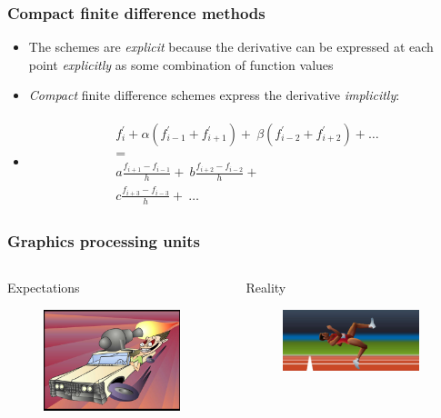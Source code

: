 \documentclass{beamer}
\begin{document}
\begin{frame}
\frametitle{Compact finite difference methods}
\pause
\begin{itemize}[<+->]
    \item The schemes are \emph{explicit}
        because the derivative can be expressed
        at each point \emph{explicitly}
        as some combination of function values
    \item \emph{Compact} finite difference schemes
        express the derivative \emph{implicitly}:
    \item [] \begin{align*}
        \begin{split}
            f_i^{\prime} + \alpha(f^{\prime}_{i-1} + f^{\prime}_{i+1}) + \
            \beta(f^{\prime}_{i-2} + f^{\prime}_{i+2}) + \hdots \\
            = \\
            a\frac{f_{i+1} - f_{i-1}}{h} + \
            b\frac{f_{i+2} - f_{i-2}}{h} + \\
            c\frac{f_{i+3} - f_{i-3}}{h} + \
            \hdots
        \end{split}
        \label{eqn:general-compact}
        \end{align*}
\end{itemize}
\end{frame}

\begin{frame}
\frametitle{Graphics processing units}
\begin{columns}[c]
     \begin{column}[T]{5cm}
        Expectations
        \begin{figure}
        \includegraphics[width=150px]{img/expectations.jpg}
        \end{figure}
    \end{column}

    \begin{column}[T]{5cm}
        Reality
        \begin{figure}
        \includegraphics[width=150px]{img/reality.png}
        \end{figure}
    \end{column}
\end{columns}
\end{frame}
\end{document}
